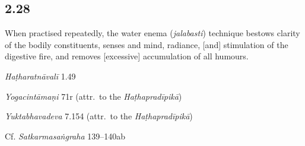 \begin{ekdosis}
\subsection*{2.28}
\begin{translation}[hp02_028]
When practised repeatedly, the water enema (\emph{jalabasti}) technique bestows clarity of the bodily constituents, senses and mind, radiance, [and] stimulation of the digestive fire, and removes [excessive] accumulation of all humours.
\end{translation}


\begin{testimonia}[hp02_028]
\emph{Haṭharatnāvalī} 1.49 

\begin{versinnote}
\end{versinnote}

\emph{Yogacintāmaṇi} 71r (attr.~to the \emph{Haṭhapradīpikā})

\begin{versinnote}
\end{versinnote}

\emph{Yuktabhavadeva} 7.154 (attr.~to the \emph{Haṭhapradīpikā})

\begin{versinnote}
\end{versinnote}

Cf. \emph{Satkarmasaṅgraha} 139–140ab


\end{testimonia}
\end{ekdosis}
